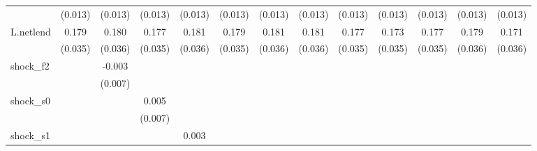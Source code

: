 {\begin{tabular}{l*{12}{c}}
            &     (0.013)         &     (0.013)         &     (0.013)         &     (0.013)         &     (0.013)         &     (0.013)         &     (0.013)         &     (0.013)         &     (0.013)         &     (0.013)         &     (0.013)         &     (0.013)         \\
\addlinespace
L.netlend   &       0.179\sym{***}&       0.180\sym{***}&       0.177\sym{***}&       0.181\sym{***}&       0.179\sym{***}&       0.181\sym{***}&       0.181\sym{***}&       0.177\sym{***}&       0.173\sym{***}&       0.177\sym{***}&       0.179\sym{***}&       0.171\sym{***}\\
            &     (0.035)         &     (0.036)         &     (0.035)         &     (0.036)         &     (0.035)         &     (0.036)         &     (0.036)         &     (0.035)         &     (0.035)         &     (0.035)         &     (0.036)         &     (0.036)         \\
\addlinespace
shock\_f2    &                     &      -0.003         &                     &                     &                     &                     &                     &                     &                     &                     &                     &                     \\
            &                     &     (0.007)         &                     &                     &                     &                     &                     &                     &                     &                     &                     &                     \\
\addlinespace
shock\_s0    &                     &                     &       0.005         &                     &                     &                     &                     &                     &                     &                     &                     &                     \\
            &                     &                     &     (0.007)         &                     &                     &                     &                     &                     &                     &                     &                     &                     \\
\addlinespace
shock\_s1    &                     &                     &                     &       0.003         &                     &                     &                     &                     &                     &                     &                     &                     \\

\end{tabular}}

